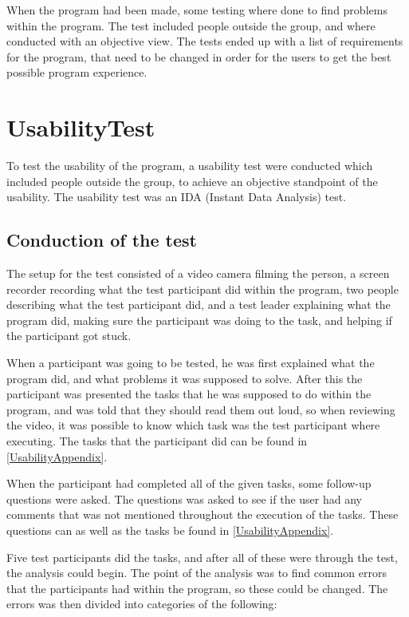 When the program had been made, some testing where done to find problems within the program. The test included people outside the group, and where conducted with an objective view. The tests ended up with a list of requirements for the program, that need to be changed in order for the users to get the best possible program experience.

\section{UsabilityTest}

To test the usability of the program, a usability test were conducted which included people outside the group, to achieve an objective standpoint of the usability. The usability test was an IDA (Instant Data Analysis) test.

\subsection{Conduction of the test}

The setup for the test consisted of a video camera filming the person, a screen recorder recording what the test participant did within the program, two people describing what the test participant did, and a test leader explaining what the program did, making sure the participant was doing to the task, and helping if the participant got stuck.

When a participant was going to be tested, he was first explained what the program did, and what problems it was supposed to solve. After this the participant was presented the tasks that he was supposed to do within the program, and was told that they should read them out loud, so when reviewing the video, it was possible to know which task was the test participant where executing. The tasks that the participant did can be found in \cref{UsabilityAppendix}.

When the participant had completed all of the given tasks, some follow-up questions were asked. The questions was asked to see if the user had any comments that was not mentioned throughout the execution of the tasks. These questions can as well as the tasks be found in \cref{UsabilityAppendix}.

Five test participants did the tasks, and after all of these were through the test, the analysis could begin. The point of the analysis was to find common errors that the participants had within the program, so these could be changed. The errors was then divided into categories of the following:

